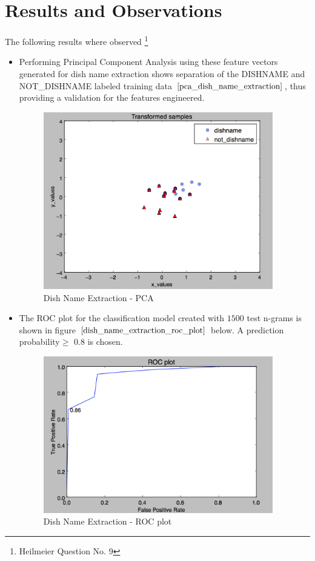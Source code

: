 \documentclass[twoside,12pt]{article}
\begin{document}
\section{Results and Observations}
\label{Results and Observations}
The following results where observed \footnote{Heilmeier Question No. 9}
\begin{itemize}
\item
Performing Principal Component Analysis using these feature vectors generated for dish name extraction shows separation of the DISHNAME and NOT\_DISHNAME labeled training data $\eqref{pca_dish_name_extraction}$, thus providing a validation for the features engineered. 

\begin{figure}[ht]
   \centering
   \includegraphics[width=100mm]{pca.png}	
  \caption{Dish Name Extraction - PCA}
  	\label{pca_dish_name_extraction}
\end{figure}

\item
The ROC plot for the classification model created with $1500$ test n-grams is shown in figure $\eqref{dish_name_extraction_roc_plot}$ below. A prediction probability$\ge$ 0.8 is chosen.

\begin{figure}[ht]
   \centering	
   \includegraphics[width=100mm]{roc.png}	
  \caption{Dish Name Extraction - ROC plot}
  \label{dish_name_extraction_roc_plot}
\end{figure}


\end{itemize}
\end{document}
